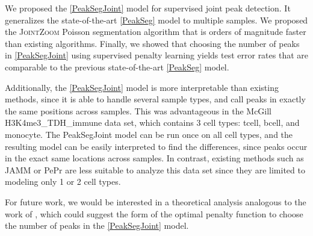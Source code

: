 \documentclass{article} %
\begin{document}
We proposed the \ref{PeakSegJoint} model for supervised joint peak
detection. It generalizes the state-of-the-art \ref{PeakSeg} model to
multiple samples. We proposed the \textsc{JointZoom} Poisson
segmentation algorithm that is orders of magnitude faster than
existing algorithms. Finally, we showed that choosing the number of
peaks in \ref{PeakSegJoint} using supervised penalty learning yields
test error rates that are comparable to the previous state-of-the-art
\ref{PeakSeg} model.

Additionally, the \ref{PeakSegJoint} model is more interpretable than
existing methods, since it is able to handle several sample types, and
call peaks in exactly the same positions across samples. This was
advantageous in the McGill H3K4me3\_TDH\_immune data set, which
contains 3 cell types: tcell, bcell, and monocyte. The PeakSegJoint
model can be run once on all cell types, and the resulting model can
be easily interpreted to find the differences, since peaks occur in
the exact same locations across samples. In contrast, existing methods
such as JAMM or PePr are less suitable to analyze this data set since
they are limited to modeling only 1 or 2 cell types.

For future work, we would be interested in a theoretical analysis
analogous to the work of \citet{cleynen2013segmentation}, which could
suggest the form of the optimal penalty function to choose the number
of peaks in the \ref{PeakSegJoint} model.

\newpage




\end{document}
